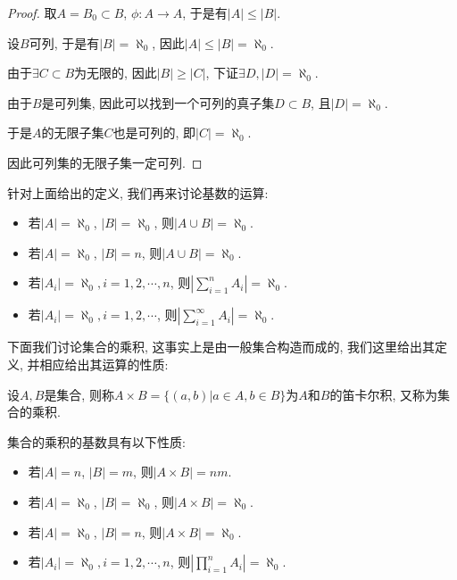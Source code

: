 \documentclass[theorem=false,mathfont=none,openany,sub3section]{easybook}
\begin{document}
\begin{proof}
  取$A= B_0\subset B$, $\phi: A\rightarrow A$, 于是有$|A|\leqslant |B|$.\par
  设$B$可列, 于是有$|B|=\aleph_{0}$, 因此$|A|\leqslant |B|=\aleph_{0}$.\par
  由于$\exists C\subset B$为无限的, 因此$|B|\geqslant |C|$, 下证$\exists D, |D|=\aleph_{0}$.\par
  由于$B$是可列集, 因此可以找到一个可列的真子集$D\subset B$, 且$|D|=\aleph_{0}$.\par
  于是$A$的无限子集$C$也是可列的, 即$|C|=\aleph_{0}$.\par
  因此可列集的无限子集一定可列.\par 
\end{proof}

针对上面给出的定义, 我们再来讨论基数的运算:\par

\begin{proposition}
  \begin{itemize}
    \item 若$|A|=\aleph_{0}$, $|B|=\aleph_{0}$, 则$|A\cup B|=\aleph_{0}$.
    \item 若$|A|=\aleph_{0}$, $|B|=n$, 则$|A\cup B|=\aleph_{0}$.
    \item 若$|A_i|=\aleph_{0}, i =1,2,\cdots, n$, 则$|\sum_{i=1}^{n}A_i|=\aleph_{0}$.
    \item 若$|A_i|=\aleph_{0}, i =1,2,\cdots$, 则$|\sum_{i=1}^{\infty}A_i|=\aleph_{0}$.
  \end{itemize}
\end{proposition}

下面我们讨论集合的乘积, 这事实上是由一般集合构造而成的, 我们这里给出其定义, 并相应给出其运算的性质:\par

\begin{definition}
  设$A,B$是集合, 则称$A\times B=\{(a,b)|a\in A, b\in B\}$为$A$和$B$的笛卡尔积, 又称为集合的乘积.\par
\end{definition}

\begin{proposition}
  集合的乘积的基数具有以下性质:\par
  \begin{itemize}
    \item 若$|A|=n$, $|B|=m$, 则$|A\times B|=nm$.
    \item 若$|A|=\aleph_{0}$, $|B|=\aleph_{0}$, 则$|A\times B|=\aleph_{0}$.
    \item 若$|A|=\aleph_{0}$, $|B|=n$, 则$|A\times B|=\aleph_{0}$.
    \item 若$|A_i|=\aleph_{0}, i =1,2,\cdots, n$, 则$|\prod_{i=1}^{n}A_i|=\aleph_{0}$.
  \end{itemize}
\end{proposition}
\end{document}
